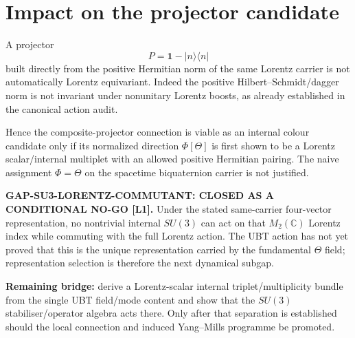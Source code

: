 \documentclass[11pt,a4paper]{article}
\begin{document}
\section{Impact on the projector candidate}

A projector
\[
 P=\mathbf1-|n\rangle\langle n|
\]
built directly from the positive Hermitian norm of the same Lorentz carrier is
not automatically Lorentz equivariant.  Indeed the positive
Hilbert--Schmidt/dagger norm is not invariant under nonunitary Lorentz boosts,
as already established in the canonical action audit.

Hence the composite-projector connection is viable as an internal colour
candidate only if its normalized direction $\Phi[\Theta]$ is first shown to be
a Lorentz scalar/internal multiplet with an allowed positive Hermitian pairing.
The naive assignment $\Phi=\Theta$ on the spacetime biquaternion carrier is
not justified.

\begin{tcolorbox}[colback=yellow!8!white,colframe=orange!70!black,title=Status]
\textbf{GAP-SU3-LORENTZ-COMMUTANT: CLOSED AS A CONDITIONAL NO-GO [L1].}
Under the stated same-carrier four-vector representation, no nontrivial internal $SU(3)$ can act on that
$M_2(\mathbb C)$ Lorentz index while commuting with the full Lorentz action.
The UBT action has not yet proved that this is the unique representation carried
by the fundamental $\Theta$ field; representation selection is therefore the
next dynamical subgap.

\medskip
\textbf{Remaining bridge:}
derive a Lorentz-scalar internal triplet/multiplicity bundle from the single
UBT field/mode content and show that the $SU(3)$ stabiliser/operator algebra
acts there.  Only after that separation is established should the local
connection and induced Yang--Mills programme be promoted.
\end{tcolorbox}
\end{document}
